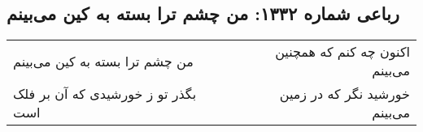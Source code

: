 \begin{center}
\section*{رباعی شماره ۱۳۳۲: من چشم ترا بسته به کین می‌بینم}
\label{sec:1332}
\begin{longtable}{l p{0.5cm} r}
من چشم ترا بسته به کین می‌بینم
&&
اکنون چه کنم که همچنین می‌بینم
\\
بگذر تو ز خورشیدی که آن بر فلک است
&&
خورشید نگر که در زمین می‌بینم
\\
\end{longtable}
\end{center}
